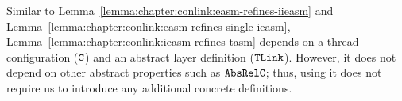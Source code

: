 Similar to Lemma~\ref{lemma:chapter:conlink:easm-refines-iieasm} and Lemma~\ref{lemma:chapter:conlink:easm-refines-single-ieasm},
Lemma~\ref{lemma:chapter:conlink:ieasm-refines-tasm} depends on a thread configuration (${{\mathrm{\texttt{C}}}}$) and an abstract layer definition (${{\mathrm{\texttt{TLink}}}}$).
However, it does not depend on other abstract properties such as ${{\mathrm{\texttt{AbsRelC}}}}$; thus,
using it does not require us to introduce any additional concrete definitions. 



%

%

